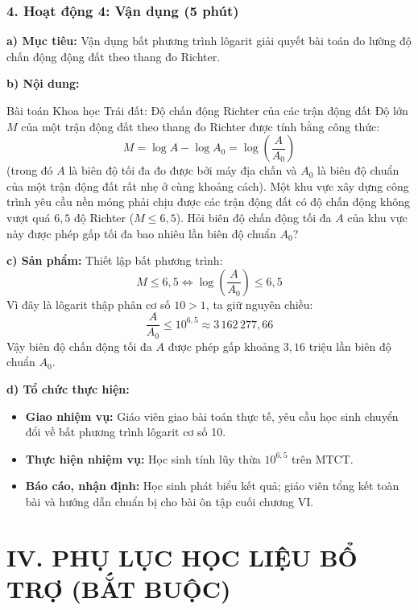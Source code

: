 \documentclass[12pt, a4paper]{article}
\begin{document}
\subsubsection*{4. Hoạt động 4: Vận dụng (5 phút)}

\noindent \textbf{a) Mục tiêu:}
Vận dụng bất phương trình lôgarit giải quyết bài toán đo lường độ chấn động động đất theo thang đo Richter.

\noindent \textbf{b) Nội dung:}
\begin{stembox}{Bài toán Khoa học Trái đất: Độ chấn động Richter của các trận động đất}
Độ lớn $M$ của một trận động đất theo thang đo Richter được tính bằng công thức:
$$M = \log A - \log A_0 = \log\left(\dfrac{A}{A_0}\right)$$
(trong đó $A$ là biên độ tối đa đo được bởi máy địa chấn và $A_0$ là biên độ chuẩn của một trận động đất rất nhẹ ở cùng khoảng cách).
Một khu vực xây dựng công trình yêu cầu nền móng phải chịu được các trận động đất có độ chấn động không vượt quá $6{,}5$ độ Richter ($M \le 6{,}5$).
Hỏi biên độ chấn động tối đa $A$ của khu vực này được phép gấp tối đa bao nhiêu lần biên độ chuẩn $A_0$?
\end{stembox}

\noindent \textbf{c) Sản phẩm:}
Thiết lập bất phương trình:
$$M \le 6{,}5 \iff \log\left(\dfrac{A}{A_0}\right) \le 6{,}5$$
Vì đây là lôgarit thập phân cơ số $10 > 1$, ta giữ nguyên chiều:
$$\dfrac{A}{A_0} \le 10^{6{,}5} \approx 3\,162\,277{,}66$$
Vậy biên độ chấn động tối đa $A$ được phép gấp khoảng $3{,}16$ triệu lần biên độ chuẩn $A_0$.

\noindent \textbf{d) Tổ chức thực hiện:}
\begin{itemize}[leftmargin=0.6cm]
    \item \textbf{Giao nhiệm vụ:} Giáo viên giao bài toán thực tế, yêu cầu học sinh chuyển đổi về bất phương trình lôgarit cơ số 10.
    \item \textbf{Thực hiện nhiệm vụ:} Học sinh tính lũy thừa $10^{6{,}5}$ trên MTCT.
    \item \textbf{Báo cáo, nhận định:} Học sinh phát biểu kết quả; giáo viên tổng kết toàn bài và hướng dẫn chuẩn bị cho bài ôn tập cuối chương VI.
\end{itemize}

\vspace{10pt}

\section*{IV. PHỤ LỤC HỌC LIỆU BỔ TRỢ (BẮT BUỘC)}
\end{document}

